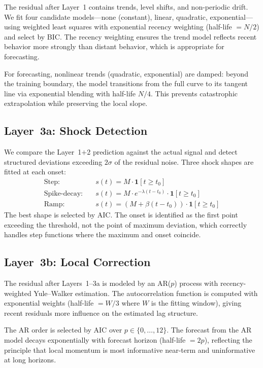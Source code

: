 \documentclass[sigconf,nonacm]{acmart}
\begin{document}
The residual after Layer~1 contains trends, level shifts, and non-periodic drift. We fit four candidate models---none (constant), linear, quadratic, exponential---using weighted least squares with exponential recency weighting (half-life $= N/2$) and select by BIC. The recency weighting ensures the trend model reflects recent behavior more strongly than distant behavior, which is appropriate for forecasting.

For forecasting, nonlinear trends (quadratic, exponential) are damped: beyond the training boundary, the model transitions from the full curve to its tangent line via exponential blending with half-life $N/4$. This prevents catastrophic extrapolation while preserving the local slope.

\subsection{Layer~3a: Shock Detection}

We compare the Layer~1$+$2 prediction against the actual signal and detect structured deviations exceeding $2\sigma$ of the residual noise. Three shock shapes are fitted at each onset:
\begin{align}
\text{Step:} &\quad s(t) = M \cdot \mathbf{1}[t \geq t_0] \\
\text{Spike-decay:} &\quad s(t) = M \cdot e^{-\lambda(t - t_0)} \cdot \mathbf{1}[t \geq t_0] \\
\text{Ramp:} &\quad s(t) = (M + \beta(t - t_0)) \cdot \mathbf{1}[t \geq t_0]
\end{align}
The best shape is selected by AIC. The onset is identified as the first point exceeding the threshold, not the point of maximum deviation, which correctly handles step functions where the maximum and onset coincide.

\subsection{Layer~3b: Local Correction}

The residual after Layers~1--3a is modeled by an AR($p$) process with recency-weighted Yule--Walker estimation. The autocorrelation function is computed with exponential weights (half-life $= W/3$ where $W$ is the fitting window), giving recent residuals more influence on the estimated lag structure.

The AR order is selected by AIC over $p \in \{0, \ldots, 12\}$. The forecast from the AR model decays exponentially with forecast horizon (half-life $= 2p$), reflecting the principle that local momentum is most informative near-term and uninformative at long horizons.
\end{document}
